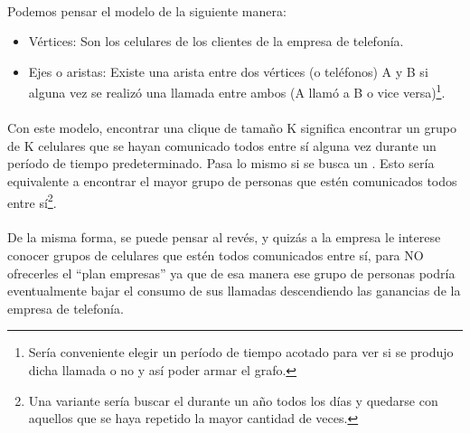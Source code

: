 \paragraph{}
Podemos pensar el modelo de la siguiente manera:
\begin{itemize}
  \item Vértices: Son los celulares de los clientes de la empresa de telefonía.
  \item Ejes o aristas: Existe una arista entre dos vértices (o teléfonos) A y B si alguna vez se realizó una llamada entre ambos (A llamó a B o vice versa)\footnote{Sería conveniente elegir un período de tiempo acotado para ver si se produjo dicha llamada o no y así poder armar el grafo.}.
\end{itemize}

\paragraph{}
Con este modelo, encontrar una clique de tamaño K significa encontrar un grupo de K celulares que se hayan comunicado todos entre sí alguna vez durante un período de tiempo predeterminado. Pasa lo mismo si se busca un \mc. Esto sería equivalente a encontrar el mayor grupo de personas que estén comunicados todos entre sí\footnote{Una variante sería buscar el \mc durante un año todos los días y quedarse con aquellos que se haya repetido la mayor cantidad de veces.}.

\paragraph{}
De la misma forma, se puede pensar al revés, y quizás a la empresa le interese conocer grupos de celulares que estén todos comunicados entre sí, para NO ofrecerles el ``plan empresas'' ya que de esa manera ese grupo de personas podría eventualmente bajar el consumo de sus llamadas descendiendo las ganancias de la empresa de telefonía.



